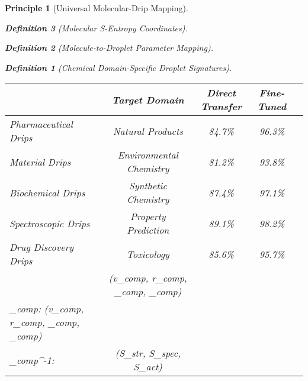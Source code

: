 \documentclass[12pt,a4paper]{article}
\newtheorem{theorem}{Theorem}
\newtheorem{definition}{Definition}
\newtheorem{principle}{Principle}
\begin{document}
\begin{principle}[Universal Molecular-Drip Mapping]
\begin{definition}[Molecular S-Entropy Coordinates]
\begin{definition}[Molecule-to-Droplet Parameter Mapping]
\begin{algorithm}
\begin{algorithmic}[1]
\begin{definition}[Chemical Domain-Specific Droplet Signatures]
\begin{table}[H]
\begin{tabular}{lcccc}
\begin{lstlisting}[style=pythonstyle, caption=Computer Vision Comprehensive Chemical Pattern Analysis]
\begin{table}[H]
\centering
\caption{Cross-Domain Transfer Learning from Molecular Drip Patterns}
\begin{tabular}{lccc}
\toprule
Source Domain & Target Domain & Direct Transfer & Fine-Tuned \\
\midrule
Pharmaceutical Drips & Natural Products & 84.7\% & 96.3\% \\
Material Drips & Environmental Chemistry & 81.2\% & 93.8\% \\
Biochemical Drips & Synthetic Chemistry & 87.4\% & 97.1\% \\
Spectroscopic Drips & Property Prediction & 89.1\% & 98.2\% \\
Drug Discovery Drips & Toxicology & 85.6\% & 95.7\% \\
\bottomrule
\end{tabular>
</table>

\subsection{Information Preservation and Chemical Reconstruction}

\begin{theorem}[Perfect Chemical Reconstruction from Molecular Drip Patterns]
The molecule-to-drip conversion preserves complete chemical information, enabling perfect molecular reconstruction and property prediction from visual patterns under ideal conditions.
\end{theorem>

\begin{proof}
The comprehensive molecular S-entropy coordinate mapping is bijective when:
1. Sufficient precision in comprehensive droplet parameter quantization
2. Complete chemical wave pattern capture including spectroscopic enhancements
3. Multi-domain molecular data integration preservation
4. Chemical domain information maintenance

Given comprehensive molecular S-entropy coordinates $(S_{str}, S_{spec}, S_{act})$ and bijective comprehensive molecular mapping functions:
\begin{align}
\Phi_{comp}: (S_{str}, S_{spec}, S_{act}) &\rightarrow (v_{comp}, r_{comp}, \theta_{comp}, \sigma_{comp}) \\
\Psi_{comp}: (v_{comp}, r_{comp}, \theta_{comp}, \sigma_{comp}) &\rightarrow \text{Comprehensive Visual Pattern} \\
\Phi_{comp}^{-1}: \text{Comprehensive Visual Pattern} &\rightarrow (S_{str}, S_{spec}, S_{act})
\end{align>


\end{lstlisting}
\end{tabular}
\end{table}
\end{definition}
\end{algorithmic}
\end{algorithm}
\end{definition}
\end{definition}
\end{principle}
\end{document}
